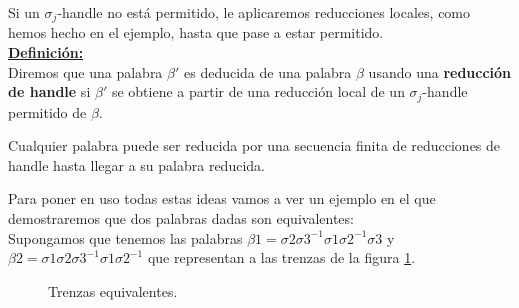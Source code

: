 Si un $\sigma_{j}$-handle no está permitido, le aplicaremos reducciones locales, como hemos hecho en el ejemplo, hasta que pase a estar permitido.\\

\underline{\textbf{Definición:}} \\
Diremos que una palabra $\beta'$ es deducida de una palabra $\beta$ usando una \textbf{reducción de handle} si $\beta'$ se obtiene a partir de una reducción local de un $\sigma_{j}$-handle permitido de $\beta$.\\

\begin{teo}
	Cualquier palabra puede ser reducida por una secuencia finita de reducciones de handle hasta llegar a su palabra reducida.
\end{teo}

\bigskip
Para poner en uso todas estas ideas vamos a ver un ejemplo en el que demostraremos que dos palabras dadas son equivalentes:\\
Supongamos que tenemos las palabras $\beta1=\sigma2\sigma3^{-1}\sigma1\sigma2^{-1}\sigma3$ y $\beta2=\sigma1\sigma2\sigma3^{-1}\sigma1\sigma2^{-1}$ que representan a las trenzas de la figura \ref{h4}.\\

\begin{figure}[h!]
	\centering
	\caption{Trenzas equivalentes.}
	\label{h4} 
\end{figure}

